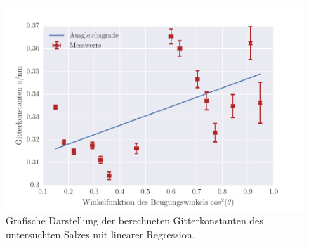 \begin{figure}[!h]
 \centering
 \includegraphics[scale=0.8]{../Grafiken/Gitterkonstante_Salz.pdf}
 \caption{Grafische Darstellung der berechneten Gitterkonstanten des untersuchten Salzes mit linearer Regression. \label{fig:gitterkonstante_salz}}
 \end{figure} 